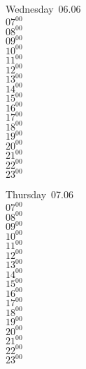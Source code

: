 \documentclass[11pt, a4paper]{book}\usepackage[]{graphicx}\usepackage[]{color}
\begin{document}
\begin{weekdaybox}
  Wednesday~06.06\\
  { 
  \vfill
  $07^{00}$\\
$08^{00}$\\
$09^{00}$\\
$10^{00}$\\
$11^{00}$\\
$12^{00}$\\
$13^{00}$\\
$14^{00}$\\
$15^{00}$\\
$16^{00}$\\
$17^{00}$\\
$18^{00}$\\
$19^{00}$\\
$20^{00}$\\
$21^{00}$\\
$22^{00}$\\
$23^{00}$\\
  }
\end{weekdaybox}
\clearpage
\begin{headerbox}
\end{headerbox}
\begin{weekdaybox}
  Thursday~07.06\\
  { 
  \vfill
  $07^{00}$\\
$08^{00}$\\
$09^{00}$\\
$10^{00}$\\
$11^{00}$\\
$12^{00}$\\
$13^{00}$\\
$14^{00}$\\
$15^{00}$\\
$16^{00}$\\
$17^{00}$\\
$18^{00}$\\
$19^{00}$\\
$20^{00}$\\
$21^{00}$\\
$22^{00}$\\
$23^{00}$\\
  }
\end{weekdaybox} 
\end{document}
